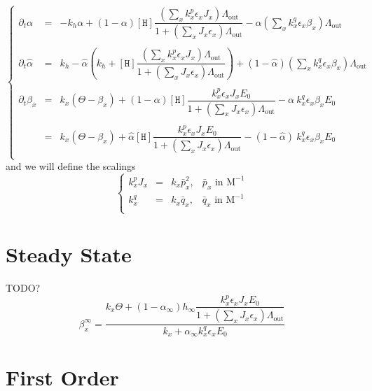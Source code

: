 \documentclass[aps,onecolumn,12pt]{revtex4}
\newcommand{\mychem}[1]{\mathtt{#1}}
\newcommand{\myconc}[1]{\left\lbrack{#1}\right\rbrack}
\newcommand{\spproton}{\mychem{H}}
\newcommand{\proton}{\myconc{\spproton}}
\newcommand{\LiAll}{\Lambda}
\newcommand{\LiAllOut}{{\LiAll}_{\mathrm{out}}}
\begin{document}
\begin{equation}
\left\lbrace
\begin{array}{rcl}
\partial_t\alpha & = &
 -k_h \alpha 
 + \left(1-\alpha\right)\proton \dfrac{\left(\sum_x k_x^p \epsilon_x J_x \right)\LiAllOut}{1+\left(\sum_x J_x \epsilon_x \right) \LiAllOut}
 - \alpha \left(\sum_x k_x^q \epsilon_x \beta_x \right) \LiAllOut\\
 \\
 \partial_t \hat\alpha & = & k_h - \hat\alpha\left(k_h+\proton\dfrac{\left(\sum_x k_x^p \epsilon_x J_x \right)\LiAllOut}{1+\left(\sum_x J_x \epsilon_x \right) \LiAllOut}\right) + (1-\hat\alpha)\left(\sum_x k_x^q \epsilon_x \beta_x \right) \LiAllOut
 \\\\
 \partial_t \beta_ x & = & k_x \left( \Theta - \beta_x \right) 
 + \left(1-\alpha\right)\proton \dfrac{k_x^p \epsilon_x J_x E_0 }{1+\left(\sum_x J_x \epsilon_x \right) \LiAllOut} 
 - \alpha \ k_x^q \epsilon_x \beta_x  E_0\\
 \\
 & = &  k_x \left( \Theta - \beta_x \right) 
 + \hat \alpha \proton \dfrac{k_x^p \epsilon_x J_x E_0 }{1+\left(\sum_x J_x \epsilon_x \right) \LiAllOut} 
 - \left(1-\hat\alpha\right)\ k_x^q \epsilon_x \beta_x  E_0\\
\end{array}
\right.
\end{equation}
and we will define the scalings
\begin{equation}
\left\lbrace
\begin{array}{ccll}
	k_x^p J_x & = & k_x \bar{p}_x^2, & \bar{p}_x \text{ in M}^{-1} \\
	k_x^q     & = & k_x \bar{q}_x  , & \bar{q}_x \text{ in M}^{-1} \\
\end{array}
\right.
\end{equation}

\section{Steady State}
TODO?
\begin{equation}
	 \beta_x^\infty =  \dfrac{k_x\Theta+ \left(1-\alpha_\infty\right) h_\infty \dfrac{k_x^p \epsilon_x J_x E_0 }{1+\left(\sum_x J_x \epsilon_x \right) \LiAllOut} }{ k_x + \alpha_\infty k_x^q \epsilon_x E_0 }
\end{equation}

\section{First Order}
\end{document}
